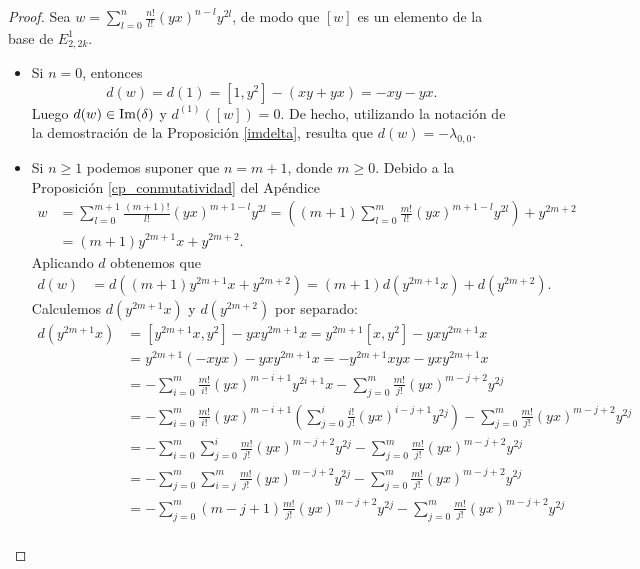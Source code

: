 \documentclass[fleqn,../tesis.tex]{subfiles}
\begin{document}
\begin{proof}
	Sea $w = \sum_{l = 0}^n \frac{n!}{l!}(yx)^{n - l}y^{2l}$, de modo que $[w]$ es un elemento de la base de $E_{2,2k}^1$.
	\begin{itemize}
		\item Si $n = 0$, entonces
			\[
				d(w) = d(1) = \left[1, y^2 \right] - (xy + yx) = -xy -yx.			
			\]
			Luego $d(w) \in \operatorname{Im}(\delta)$ y $d^{(1)}(\left[w\right]) = 0$.
			De hecho, utilizando la notación de la demostración de la Proposición \ref{imdelta}, resulta que
			$d(w) = -\lambda_{0,0}$.
		\item Si $n \geq 1$ podemos suponer que $n = m + 1$, donde $m \geq 0$. Debido a la Proposición \ref{cp_conmutatividad}
		del Apéndice
			\begin{align*}
				w &= \sum_{l = 0}^{m + 1} \frac{(m + 1)!}{l!}(yx)^{m + 1 - l}y^{2l}
					= \left((m + 1)\sum_{l = 0}^m\frac{m!}{l!}(yx)^{m + 1 - l}y^{2l}\right) + y^{2m + 2} \\
				&= (m + 1)y^{2m + 1}x + y^{2m + 2}.
			\end{align*}	
			Aplicando $d$ obtenemos que
			\begin{align*}
				d(w) &= d((m + 1)y^{2m + 1}x + y^{2m + 2}) = (m + 1)d(y^{2m + 1}x) + d(y^{2m + 2}).		
			\end{align*}
			Calculemos $d(y^{2m + 1}x)$ y $d(y^{2m + 2})$ por separado:
			\begin{align*}
				d(y^{2m + 1}x) &= \left[y^{2m + 1}x, y^2\right] - yxy^{2m + 1}x = y^{2m + 1}\left[x,y^2\right] - yxy^{2m + 1}x\\
				&= y^{2m + 1}(-xyx) - yxy^{2m + 1}x = -y^{2m + 1}xyx - yxy^{2m + 1}x\\
				&= -\sum_{i = 0}^m\frac{m!}{i!}(yx)^{m -i + 1}y^{2i +1}x - \sum_{j = 0}^{m}\frac{m!}{j!}(yx)^{m -j + 2}y^{2j} \\
				&= -\sum_{i = 0}^m\frac{m!}{i!}(yx)^{m -i + 1}\left(\sum_{j = 0}^{i}\frac{i!}{j!}(yx)^{i - j + 1}y^{2j}\right)
					- \sum_{j = 0}^{m}\frac{m!}{j!}(yx)^{m -j + 2}y^{2j} \\
				&= -\sum_{i = 0}^m\sum_{j = 0}^i\frac{m!}{j!}(yx)^{m -j + 2}y^{2j}
					- \sum_{j = 0}^{m}\frac{m!}{j!}(yx)^{m -j + 2}y^{2j} \\
				&= -\sum_{j = 0}^m\sum_{i = j}^m\frac{m!}{j!}(yx)^{m -j + 2}y^{2j}
					- \sum_{j = 0}^{m}\frac{m!}{j!}(yx)^{m -j + 2}y^{2j} \\
				&= -\sum_{j = 0}^m(m - j + 1)\frac{m!}{j!}(yx)^{m -j + 2}y^{2j}
					- \sum_{j = 0}^{m}\frac{m!}{j!}(yx)^{m -j + 2}y^{2j} \\

\end{align*}
\end{itemize}
\end{proof}
\end{document}
